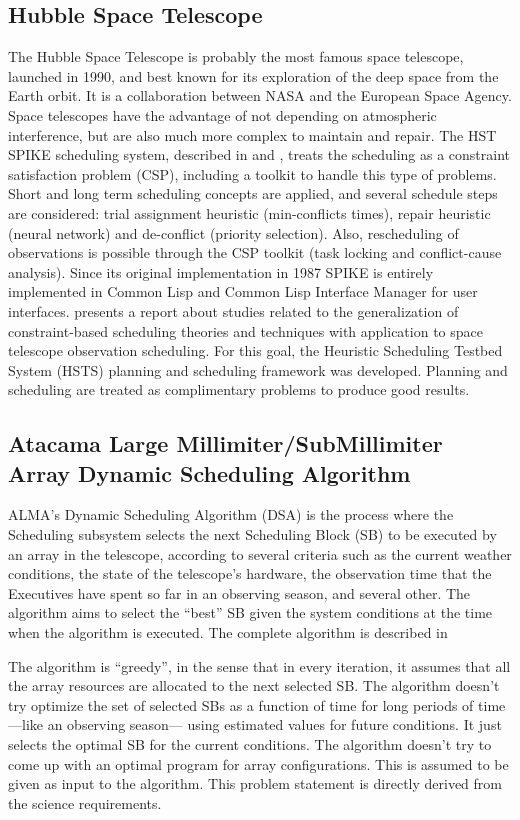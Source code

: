 \subsection{Hubble Space Telescope}
The Hubble Space Telescope is probably the most famous space telescope, launched in 1990, and best known for its exploration of the deep space from the Earth orbit. It is a collaboration between NASA and the European Space Agency. Space telescopes have the advantage of not depending on atmospheric interference, but are also much more complex to maintain and repair. The HST SPIKE scheduling system, described in \cite{johnston90} and \cite{zweben94}, treats the scheduling as a constraint satisfaction problem (CSP), including a toolkit to handle this type of problems. Short and long term scheduling concepts are applied, and several schedule steps are considered: trial assignment heuristic (min-conflicts times), repair heuristic (neural network) and de-conflict (priority selection). Also, rescheduling of observations is possible through the CSP toolkit (task locking and conflict-cause analysis). Since its original implementation in 1987 SPIKE is entirely implemented in Common Lisp and Common Lisp Interface Manager for user interfaces. \cite{muscettola96} presents a report about studies related to the generalization of constraint-based scheduling theories and techniques with application to space telescope observation scheduling. For this goal, the Heuristic Scheduling Testbed System (HSTS) planning and scheduling framework was developed. Planning and scheduling are treated as complimentary problems to produce good results.

\subsection{Atacama Large Millimiter/SubMillimiter Array Dynamic Scheduling Algorithm}
\label{sec:alma-dsa}

ALMA's Dynamic Scheduling Algorithm (DSA) is the process where the Scheduling subsystem selects the next Scheduling Block (SB) to be executed by an array in the telescope, according to several criteria such as the current weather conditions, the state of the telescope's hardware, the observation time that the Executives have spent so far in an observing season, and several other. The algorithm aims to select the ``best'' SB given the system conditions at the time when the algorithm is executed. The complete algorithm is described in \cite{avarias11} 

The algorithm is ``greedy'', in the sense that in every iteration, it assumes that all the array resources are allocated to the next selected SB. The algorithm doesn't try optimize the set of selected SBs as a function of time for long periods of time ---like an observing season--- using estimated values for future conditions. It just selects the optimal SB for the current conditions. The algorithm doesn't try to come up with an optimal program for array configurations. This is assumed to be given as input to the algorithm. This problem statement is directly derived from the science requirements.

